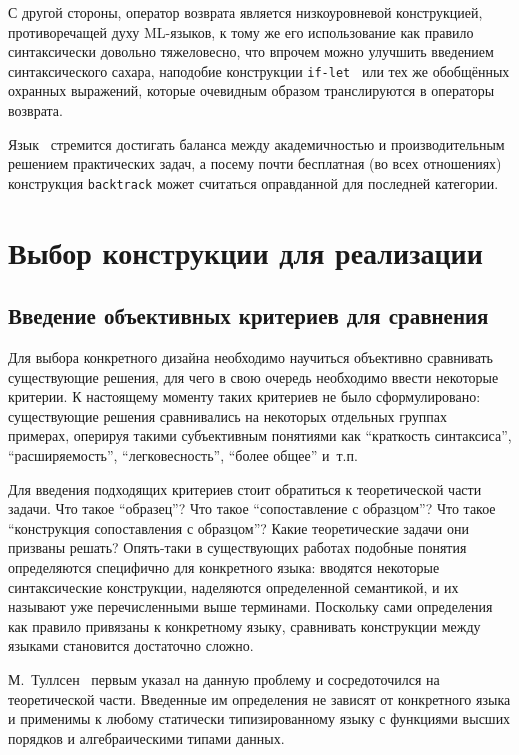 С другой стороны, оператор возврата является низкоуровневой конструкцией, противоречащей духу ML-языков, к тому же его использование как правило синтаксически довольно тяжеловесно, что впрочем можно улучшить введением синтаксического сахара, наподобие конструкции \lstinline[language=none]|if-let|~\cite{ocaml_iflet} или тех же обобщённых охранных выражений, которые очевидным образом транслируются в операторы возврата.

Язык \ocaml~стремится достигать баланса между академичностью и производительным решением практических задач, а посему почти бесплатная (во всех отношениях) конструкция \lstinline|backtrack| может считаться оправданной для последней категории.

\section{Выбор конструкции для реализации} \label{sec:match_ext}

\subsection{Введение объективных критериев для сравнения} \label{sec:criteria_introduction}

Для выбора конкретного дизайна необходимо научиться объективно сравнивать существующие решения, для чего в свою очередь необходимо ввести некоторые критерии. К настоящему моменту таких критериев не было сформулировано: существующие решения сравнивались на некоторых отдельных группах примерах, оперируя такими субъективным понятиями как ``краткость синтаксиса'', ``расширяемость'', ``легковесность'', ``более общее'' и~т.п.

Для введения подходящих критериев стоит обратиться к теоретической части задачи. Что такое ``образец''? Что такое ``сопоставление с образцом''? Что такое ``конструкция сопоставления с образцом''? Какие теоретические задачи они призваны решать? Опять-таки в существующих работах подобные понятия определяются специфично для конкретного языка: вводятся некоторые синтаксические конструкции, наделяются определенной семантикой, и их называют уже перечисленными выше терминами. Поскольку сами определения как правило привязаны к конкретному языку, сравнивать конструкции между языками становится достаточно сложно. 

М.~Туллсен~\cite{tullsen2000firstclass} первым указал на данную проблему и сосредоточился на теоретической части. Введенные им определения не зависят от конкретного языка и применимы к любому статически типизированному языку с функциями высших порядков и алгебраическими типами данных. 

